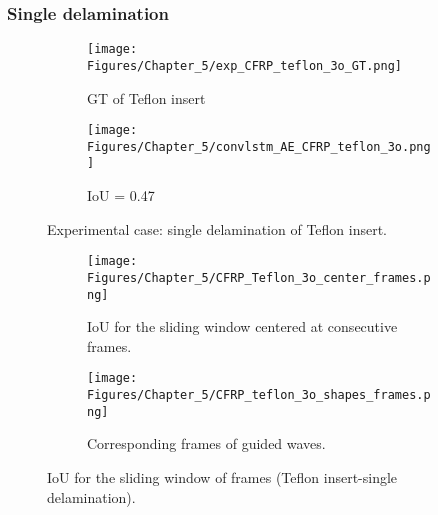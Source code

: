 \subsubsection{Single delamination}
\label{sec5321}

\begin{figure} [!h]
	\centering
	\begin{subfigure}[b]{0.47\textwidth}
		\centering
		\texttt{[image: Figures/Chapter\_5/exp\_CFRP\_teflon\_3o\_GT.png]}
		\caption{GT of Teflon insert}
		\label{fig:exp_CFRP_teflon_3o_GT}
	\end{subfigure}
	\begin{subfigure}[b]{0.47\textwidth}
		\centering
		\texttt{[image: Figures/Chapter\_5/convlstm\_AE\_CFRP\_teflon\_3o.png]}
		\caption{IoU = 0.47}
		\label{fig:convlstm_AE_CFRP_teflon_3o}
	\end{subfigure}
	\caption{Experimental case: single delamination of Teflon insert.}
	\label{fig:exp_Teflon_insert}
\end{figure} 

\begin{figure} [!h]
	\begin{subfigure}[b]{1\textwidth}
		\centering
		\texttt{[image: Figures/Chapter\_5/CFRP\_Teflon\_3o\_center\_frames.png]}
		\caption{IoU for the sliding window centered at consecutive frames.}
		\label{fig:CFRP_Teflon_3o_center_frames}
	\end{subfigure}
	\begin{subfigure}[b]{1\textwidth}
		\centering
		\texttt{[image: Figures/Chapter\_5/CFRP\_teflon\_3o\_shapes\_frames.png]}
		\caption{Corresponding frames of guided waves.} 
		\label{fig:CFRP_teflon_3o_preds_frames}
	\end{subfigure}
	\caption{IoU for the sliding window of frames (Teflon insert-single delamination).}
	\label{fig:CFRP_Teflon_3o_IoU_centre_window}
\end{figure} 

